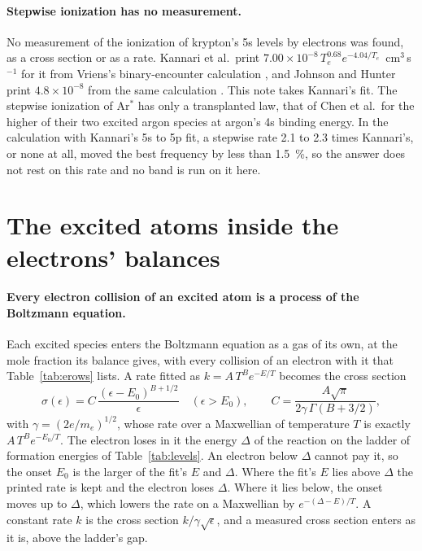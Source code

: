 \documentclass[11pt]{article}
\begin{document}
\paragraph{Stepwise ionization has no measurement.}
No measurement of the ionization of krypton's 5s levels by electrons was found, as a cross section or as a rate.
Kannari et al.\ print $7.00\times10^{-8}\,T_e^{0.68}e^{-4.04/T_e}$~cm$^3$\,s$^{-1}$ for it from Vriens's
binary-encounter calculation \cite{Kannari1985,Vriens1965}, and Johnson and Hunter print $4.8\times10^{-8}$ from
the same calculation \cite{JH1980}. This note takes Kannari's fit. The stepwise ionization of Ar$^*$ has only a
transplanted law, that of Chen et al.\ for the higher of their two excited argon species
\cite{Chen2025} at argon's 4s binding energy. In the calculation with Kannari's 5s to 5p fit, a stepwise rate
2.1 to 2.3 times Kannari's, or none at all, moved the best frequency by less than 1.5~\%, so the answer does not
rest on this rate and no band is run on it here.

\section{The excited atoms inside the electrons' balances}
\label{sec:loop}

\paragraph{Every electron collision of an excited atom is a process of the Boltzmann equation.}
Each excited species enters the Boltzmann equation as a gas of its own, at the mole fraction its balance gives,
with every collision of an electron with it that Table~\ref{tab:erows} lists. A rate fitted as $k=A\,T^B e^{-E/T}$
becomes the cross section
\begin{equation}
\sigma(\epsilon)=C\,\frac{(\epsilon-E_0)^{B+1/2}}{\epsilon}\quad(\epsilon>E_0),\qquad
C=\frac{A\sqrt{\pi}}{2\gamma\,\Gamma(B+3/2)},
\label{eq:sigma}
\end{equation}
with $\gamma=(2e/m_e)^{1/2}$, whose rate over a Maxwellian of temperature $T$ is exactly $A\,T^Be^{-E_0/T}$. The
electron loses in it the energy $\Delta$ of the reaction on the ladder of formation energies of
Table~\ref{tab:levels}. An electron below $\Delta$ cannot pay it, so the onset $E_0$ is the larger of the fit's $E$
and $\Delta$. Where the fit's $E$ lies above $\Delta$ the printed rate is kept and the electron loses $\Delta$.
Where it lies below, the onset moves up to $\Delta$, which lowers the rate on a Maxwellian by $e^{-(\Delta-E)/T}$.
A constant rate $k$ is the cross section $k/\gamma\sqrt{\epsilon}$, and a measured cross section enters as it is,
above the ladder's gap.
\end{document}
